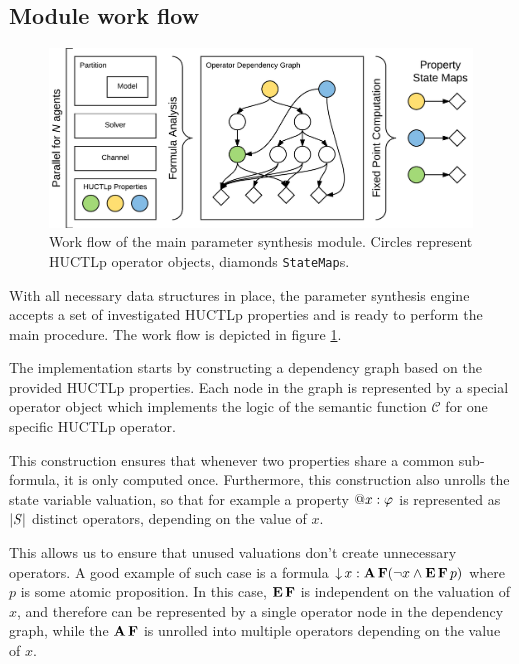 \subsection{Module work flow}

\begin{figure}[]
	\centering
	\includegraphics[scale=0.45]{media/core_workflow.pdf}
	\caption{Work flow of the main parameter synthesis module. Circles represent \ac{HUCTLp} operator objects, diamonds \texttt{StateMap}s. }
	\label{fig:core_workflow}
\end{figure}

With all necessary data structures in place, the parameter synthesis engine accepts a set of investigated \ac{HUCTLp} properties and is ready to perform the main procedure. The work flow is depicted in figure \ref{fig:core_workflow}.

The implementation starts by constructing a dependency graph based on the provided \ac{HUCTLp} properties. Each node in the graph is represented by a special operator object which implements the logic of the semantic function $\mathcal{C}$ for one specific \ac{HUCTLp} operator. 

This construction ensures that whenever two properties share a common sub-formula, it is only computed once. Furthermore, this construction also unrolls the state variable valuation, so that for example a property $\operatorname{@\!} x : \varphi$ is represented as $|\mathit{S}|$ distinct operators, depending on the value of $x$. 


This allows us to ensure that unused valuations don't create unnecessary operators. A good example of such case is a formula $\operatorname{\downarrow} x : \operatorname{\mathbf{A}}\operatorname{\mathbf{F}} (\neg x \land \operatorname{\mathbf{E}}\operatorname{\mathbf{F}} p)$ where $p$ is some atomic proposition. In this case, $\operatorname{\mathbf{E}}\operatorname{\mathbf{F}}$ is independent on the valuation of $x$, and therefore can be represented by a single operator node in the dependency graph, while the $\operatorname{\mathbf{A}}\operatorname{\mathbf{F}}$ is unrolled into multiple operators depending on the value of $x$.

